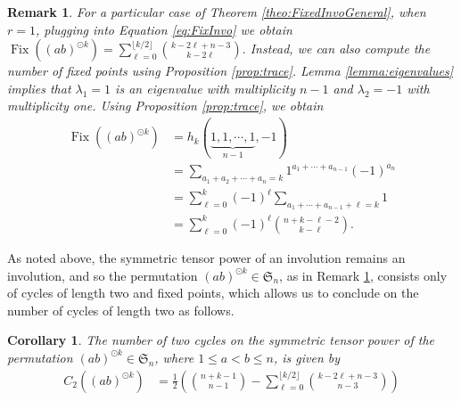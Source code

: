 \documentclass[12pt]{amsart}
\newtheorem{corollary}{Corollary}[section]
\newtheorem{remark}{Remark}{}
\newcommand{\fix}{\operatorname{Fix}}
\newcommand{\diego}[1]{{\color{WildStrawberry} \sf  #1}}
\begin{document}
\begin{remark}
\label{rem:invo}
For a particular case of Theorem \ref{theo:FixedInvoGeneral}, when $r=1$, plugging into Equation \ref{eq:FixInvo} we obtain $\displaystyle \fix \left ((ab)^{\odot k}\right ) = \sum _{\ell =0}^{\lfloor k/2\rfloor }\binom{k-2\ell+n-3}{k-2\ell}.$
Instead, we can also compute the number of fixed points using Proposition \ref{prop:trace}. Lemma \ref{lemma:eigenvalues} implies that $\lambda _1 = 1$ is an eigenvalue with multiplicity $n-1$ and $\lambda _2 = -1$ with multiplicity one. Using Proposition \ref{prop:trace}, we obtain
    \begin{align*}
            \fix \left ((ab)^{\odot k}\right ) &= h_k(\underbrace{1,1,\cdots,1}_{n-1},-1)\\
            &=\sum _{a_1+a_2+\cdots +a_{n}=k}1^{a_1+\cdots +a_{n-1}}(-1)^{a_n}\\
            &=\sum _{\ell = 0}^k(-1)^{\ell}\sum _{a_1+\cdots +a_{n-1}+\ell = k}1\\
            &=\sum _{\ell =0 }^k(-1)^{\ell}\binom{n+k-\ell -2}{k-\ell}.
    \end{align*}  
\end{remark}

As noted above, the symmetric tensor power of an involution remains an involution, and so  the permutation $(ab)^{\odot k}\in \mathfrak{S}_n$, as in Remark \ref{rem:invo}, consists only of cycles of length two and fixed points, which allows us to conclude on the number of cycles of length two as follows.
\begin{corollary}
    The number of two cycles on the symmetric tensor power of the permutation $(ab)^{\odot k} \in \mathfrak{S}_n$, where $1\leq a<b\leq n$, is given by
    \begin{align*}
        C_2\left ((ab)^{\odot k}\right) &= \frac{1}{2}\left (\binom{n+k-1}{n-1}-\sum _{\ell =0}^{\lfloor k/2\rfloor }\binom{k-2\ell+n-3}{n-3}\right )
    \end{align*}
\end{corollary}


    
\end{document}
